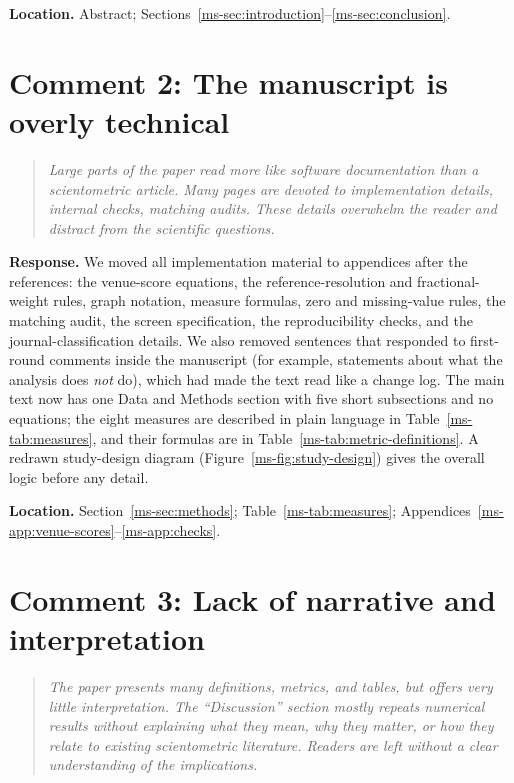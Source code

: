 \documentclass[11pt]{article}
\newcommand{\commenttext}[1]{\begin{quote}\itshape #1\end{quote}}
\newcommand{\response}{\textbf{Response.} }
\newcommand{\location}[1]{\textbf{Location.} #1.}
\begin{document}
\location{Abstract; Sections~\ref{ms-sec:introduction}--\ref{ms-sec:conclusion}}

\section*{Comment 2: The manuscript is overly technical}

\commenttext{Large parts of the paper read more like software documentation than a scientometric article. Many pages are devoted to implementation details, internal checks, matching audits. These details overwhelm the reader and distract from the scientific questions.}

\response We moved all implementation material to appendices after the references: the venue-score equations, the reference-resolution and fractional-weight rules, graph notation, measure formulas, zero and missing-value rules, the matching audit, the screen specification, the reproducibility checks, and the journal-classification details.  We also removed sentences that responded to first-round comments inside the manuscript (for example, statements about what the analysis does \emph{not} do), which had made the text read like a change log.  The main text now has one Data and Methods section with five short subsections and no equations; the eight measures are described in plain language in Table~\ref{ms-tab:measures}, and their formulas are in Table~\ref{ms-tab:metric-definitions}.  A redrawn study-design diagram (Figure~\ref{ms-fig:study-design}) gives the overall logic before any detail.

\location{Section~\ref{ms-sec:methods}; Table~\ref{ms-tab:measures}; Appendices~\ref{ms-app:venue-scores}--\ref{ms-app:checks}}

\section*{Comment 3: Lack of narrative and interpretation}

\commenttext{The paper presents many definitions, metrics, and tables, but offers very little interpretation. The ``Discussion'' section mostly repeats numerical results without explaining what they mean, why they matter, or how they relate to existing scientometric literature. Readers are left without a clear understanding of the implications.}
\end{document}
